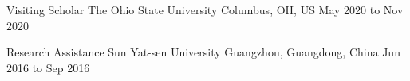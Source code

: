 
\begin{cventries}
  \cventry
    {Visiting Scholar} %
    {The Ohio State University} %
    {Columbus, OH, US} %
    {May 2020 to Nov 2020} %
    {
    }
\end{cventries}


\begin{cventries}
  \cventry
    {Research Assistance} %
    {Sun Yat-sen University} %
    {Guangzhou, Guangdong, China} %
    {Jun 2016 to Sep 2016} %
    {
    }
\end{cventries}